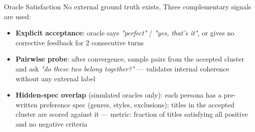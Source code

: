 \begin{frame}{Oracle Satisfaction}
  No external ground truth exists, Three complementary signals are used:
  \begin{itemize}
    \item \textbf{Explicit acceptance}: oracle says \textit{"perfect"} / \textit{"yes, that's it"}, or gives no corrective feedback for 2 consecutive turns
    \item \textbf{Pairwise probe}: after convergence, sample pairs from the accepted cluster and ask \textit{"do these two belong together?"} — validates internal coherence without any external label
    \item \textbf{Hidden-spec overlap} (simulated oracles only): each persona has a pre-written preference spec (genres, styles, exclusions); titles in the accepted cluster are scored against it — metric: fraction of titles satisfying all positive and no negative criteria
  \end{itemize}
\end{frame}

